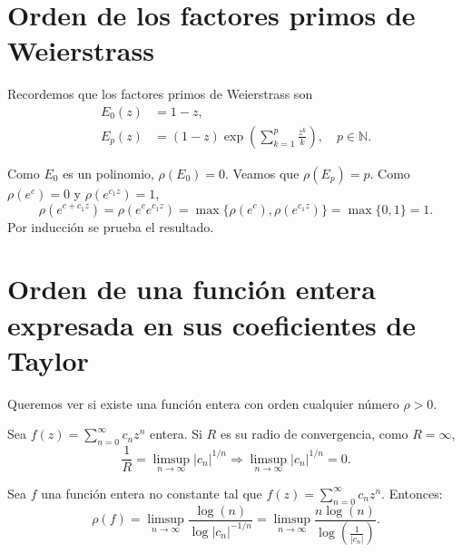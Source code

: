 
\section{Orden de los factores primos de Weierstrass}
Recordemos que los factores primos de Weierstrass son
\begin{align*}
    E_0(z) & = 1-z,                                                                      \\
    E_p(z) & = (1-z)\exp\left(\sum_{k=1}^p \frac{z^k}{k}\right), \quad p \in \mathbb{N}.
\end{align*}

Como $E_0$ es un polinomio, $\rho(E_0) = 0$.
Veamos que $\rho(E_p) = p$.
Como $\rho(e^c) = 0$ y $\rho(e^{c_1z}) = 1$,
$$\rho(e^{c+c_1z}) = \rho(e^ce^{c_1z}) = \max\{\rho(e^c), \rho(e^{c_1z})\} = \max\{0, 1\} = 1.$$
Por inducción se prueba el resultado.

\section{Orden de una función entera expresada en sus coeficientes de Taylor}
Queremos ver si existe una función entera con orden cualquier número $\rho > 0$.

Sea $f(z) = \sum_{n=0}^\infty c_nz^n$ entera.
Si $R$ es su radio de convergencia, como $R = \infty$,
$$\frac{1}{R} = \limsup_{n \to \infty} |c_n|^{1/n} \Rightarrow \limsup_{n \to \infty} |c_n|^{1/n} = 0.$$

\begin{theorem}
    Sea $f$ una función entera no constante tal que $f(z) = \sum_{n=0}^\infty c_nz^n$.
    Entonces:
    $$\rho(f) = \limsup_{n \to \infty} \frac{\log(n)}{\log|c_n|^{-1/n}} = \limsup_{n \to \infty} \frac{n\log(n)}{\log\left(\frac{1}{|c_n|}\right)}.$$
\end{theorem}

